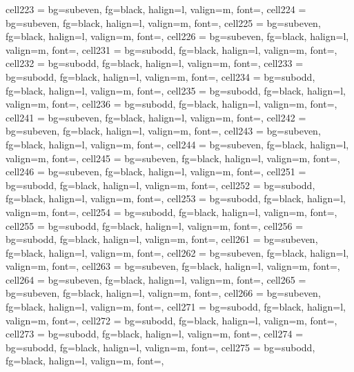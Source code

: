 \documentclass[a4paper,12pt]{article}
\begin{document}
\begin{longtblr}
{  cell{22}{3} = {bg=subeven, fg=black, halign=l, valign=m, font=\footnotesize},
  cell{22}{4} = {bg=subeven, fg=black, halign=l, valign=m, font=\footnotesize},
  cell{22}{5} = {bg=subeven, fg=black, halign=l, valign=m, font=\footnotesize},
  cell{22}{6} = {bg=subeven, fg=black, halign=l, valign=m, font=\footnotesize},
  cell{23}{1} = {bg=subodd, fg=black, halign=l, valign=m, font=\footnotesize},
  cell{23}{2} = {bg=subodd, fg=black, halign=l, valign=m, font=\footnotesize},
  cell{23}{3} = {bg=subodd, fg=black, halign=l, valign=m, font=\footnotesize},
  cell{23}{4} = {bg=subodd, fg=black, halign=l, valign=m, font=\footnotesize},
  cell{23}{5} = {bg=subodd, fg=black, halign=l, valign=m, font=\footnotesize},
  cell{23}{6} = {bg=subodd, fg=black, halign=l, valign=m, font=\footnotesize},
  cell{24}{1} = {bg=subeven, fg=black, halign=l, valign=m, font=\footnotesize},
  cell{24}{2} = {bg=subeven, fg=black, halign=l, valign=m, font=\footnotesize},
  cell{24}{3} = {bg=subeven, fg=black, halign=l, valign=m, font=\footnotesize},
  cell{24}{4} = {bg=subeven, fg=black, halign=l, valign=m, font=\footnotesize},
  cell{24}{5} = {bg=subeven, fg=black, halign=l, valign=m, font=\footnotesize},
  cell{24}{6} = {bg=subeven, fg=black, halign=l, valign=m, font=\footnotesize},
  cell{25}{1} = {bg=subodd, fg=black, halign=l, valign=m, font=\footnotesize},
  cell{25}{2} = {bg=subodd, fg=black, halign=l, valign=m, font=\footnotesize},
  cell{25}{3} = {bg=subodd, fg=black, halign=l, valign=m, font=\footnotesize},
  cell{25}{4} = {bg=subodd, fg=black, halign=l, valign=m, font=\footnotesize},
  cell{25}{5} = {bg=subodd, fg=black, halign=l, valign=m, font=\footnotesize},
  cell{25}{6} = {bg=subodd, fg=black, halign=l, valign=m, font=\footnotesize},
  cell{26}{1} = {bg=subeven, fg=black, halign=l, valign=m, font=\footnotesize},
  cell{26}{2} = {bg=subeven, fg=black, halign=l, valign=m, font=\footnotesize},
  cell{26}{3} = {bg=subeven, fg=black, halign=l, valign=m, font=\footnotesize},
  cell{26}{4} = {bg=subeven, fg=black, halign=l, valign=m, font=\footnotesize},
  cell{26}{5} = {bg=subeven, fg=black, halign=l, valign=m, font=\footnotesize},
  cell{26}{6} = {bg=subeven, fg=black, halign=l, valign=m, font=\footnotesize},
  cell{27}{1} = {bg=subodd, fg=black, halign=l, valign=m, font=\footnotesize},
  cell{27}{2} = {bg=subodd, fg=black, halign=l, valign=m, font=\footnotesize},
  cell{27}{3} = {bg=subodd, fg=black, halign=l, valign=m, font=\footnotesize},
  cell{27}{4} = {bg=subodd, fg=black, halign=l, valign=m, font=\footnotesize},
  cell{27}{5} = {bg=subodd, fg=black, halign=l, valign=m, font=\footnotesize},
}
\end{longtblr}
\end{document}
